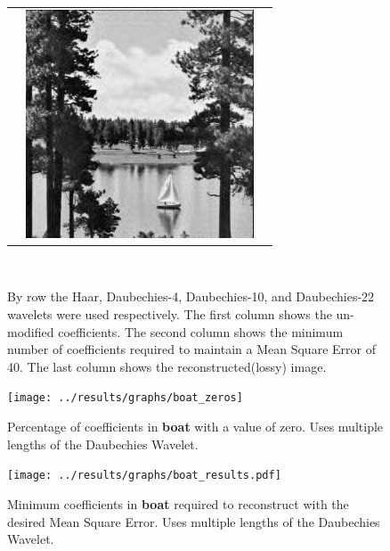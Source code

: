 \begin{figure}[hbt]
\begin{tabular}{ S @{} S @{} S }
		&	\includegraphics[height=0.25\textwidth]{../images/boat_d22_final} \\
	\end{tabular} \\
	\caption{By row the Haar, Daubechies-4, Daubechies-10, and Daubechies-22 wavelets were used 
					 respectively. The first
					 column shows the un-modified coefficients.  The second column shows the minimum number
					 of coefficients required to maintain a Mean Square Error of 40.
					 The last column shows the reconstructed(lossy) image.}
\end{figure}

\begin{figure}[hbt]
	\centering
	\label{fig:boat_zeros}
		\texttt{[image: ../results/graphs/boat\_zeros]}
	\caption{Percentage of coefficients in {\bf boat} with a value of zero. Uses multiple lengths of the Daubechies Wavelet. }
\end{figure}
\begin{figure}[hbt]
	\centering
	\label{fig:boat_stats}
		\texttt{[image: ../results/graphs/boat\_results.pdf]}
	\caption{Minimum coefficients in {\bf boat} required to reconstruct with the desired Mean Square Error. Uses multiple lengths of the Daubechies Wavelet. }
\end{figure}





